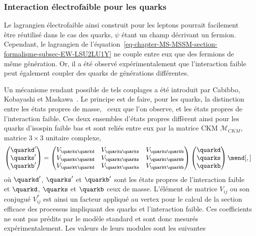 \subsubsection{Interaction électrofaible pour les quarks}\label{chapter-MS-MSSM-section-formalisme-subsec-EW-quarks}
Le lagrangien électrofaible ainsi construit pour les leptons pourrait facilement être réutilisé dans le cas des quarks, $\psi$ étant un champ décrivant un fermion. Cependant, le lagrangien de l'équation~\eqref{eq-chapter-MS-MSSM-section-formalisme-subsec-EW-LSU2LU1Y} ne couple entre eux que des fermions de même génération. Or, il a été observé expérimentalement que l'interaction faible peut également coupler des quarks de générations différentes.
\par Un mécanisme rendant possible de tels couplages a été introduit par Cabibbo, Kobayashi et Maskawa~\cite{CMK_C1,CMK_C2,CKM_KM}. Le principe est de faire, pour les quarks, la distinction entre les états propres de masse, \ie\ ceux que l'on observe, et les états propres de l'interaction faible. Ces deux ensembles d'états propres diffèrent ainsi pour les quarks d'isospin faible bas et sont reliés entre eux par la matrice CKM $\mathcal{M}_{CKM}$, matrice $3\times3$ unitaire complexe,
\begin{equation}
\begin{pmatrix}
\quarkd' \\ \quarks' \\ \quarkb'
\end{pmatrix}
=
\begin{pmatrix}
V_{\quarku\quarkd} & V_{\quarku\quarks} & V_{\quarku\quarkb} \\
V_{\quarkc\quarkd} & V_{\quarkc\quarks} & V_{\quarkc\quarkb} \\
V_{\quarkt\quarkd} & V_{\quarkt\quarks} & V_{\quarkt\quarkb}
\end{pmatrix}
\begin{pmatrix}
\quarkd \\ \quarks \\ \quarkb
\end{pmatrix}
\mend[,]
\end{equation}
où $\quarkd'$, $\quarks'$ et $\quarkb'$ sont les états propres de l'interaction faible et $\quarkd$, $\quarks$ et $\quarkb$ ceux de masse. L'élément de matrice $V_{ij}$ ou son conjugué $V_{ij}^*$ est ainsi un facteur appliqué au vertex pour le calcul de la section efficace des processus impliquant des quarks et l'interaction faible. Ces coefficients ne sont pas prédits par le modèle standard et sont donc mesurés expérimentalement. Les valeurs de leurs modules sont les suivantes~\cite{PDG_booklet_2020}
